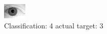 \begin{figure}[h!]
\begin{center}
\includegraphics[width=0.60\columnwidth]{figures/ID2167_class_4_target_3.png}
\end{center}
\caption{ Classification: 4 actual target: 3}
\label{fig:ID2167_class_4_target_3}
\end{figure}
